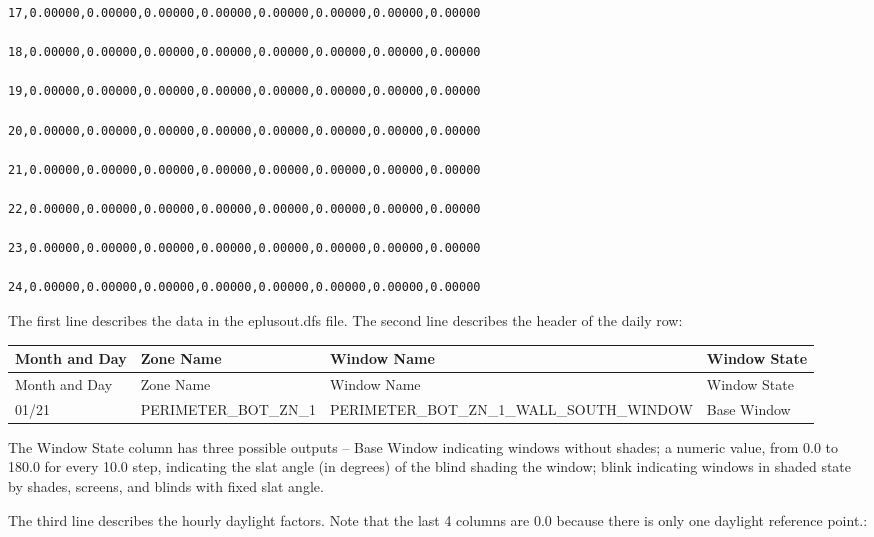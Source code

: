 \begin{lstlisting}
17,0.00000,0.00000,0.00000,0.00000,0.00000,0.00000,0.00000,0.00000

18,0.00000,0.00000,0.00000,0.00000,0.00000,0.00000,0.00000,0.00000

19,0.00000,0.00000,0.00000,0.00000,0.00000,0.00000,0.00000,0.00000

20,0.00000,0.00000,0.00000,0.00000,0.00000,0.00000,0.00000,0.00000

21,0.00000,0.00000,0.00000,0.00000,0.00000,0.00000,0.00000,0.00000

22,0.00000,0.00000,0.00000,0.00000,0.00000,0.00000,0.00000,0.00000

23,0.00000,0.00000,0.00000,0.00000,0.00000,0.00000,0.00000,0.00000

24,0.00000,0.00000,0.00000,0.00000,0.00000,0.00000,0.00000,0.00000
\end{lstlisting}

The first line describes the data in the eplusout.dfs file. The second line describes the header of the daily row:

{\scriptsize
\begin{longtable}[c]{>{\raggedright}p{1.5in}>{\raggedright}p{1.5in}>{\raggedright}p{1.5in}>{\raggedright}p{1.5in}}
\toprule 
Month and Day & Zone Name & Window Name & Window State \tabularnewline
\midrule
\endfirsthead

\toprule 
Month and Day & Zone Name & Window Name & Window State \tabularnewline
\midrule
\endhead

01/21 & PERIMETER\-\_BOT\-\_ZN\-\_1 & PERIMETER\-\_BOT\-\_ZN\-\_1\-\_WALL\-\_SOUTH\-\_WINDOW & Base Window \tabularnewline
\bottomrule
\end{longtable}}

The Window State column has three possible outputs -- Base Window indicating windows without shades; a numeric value, from 0.0 to 180.0 for every 10.0 step, indicating the slat angle (in degrees) of the blind shading the window; blink indicating windows in shaded state by shades, screens, and blinds with fixed slat angle.

The third line describes the hourly daylight factors. Note that the last 4 columns are 0.0 because there is only one daylight reference point.:

